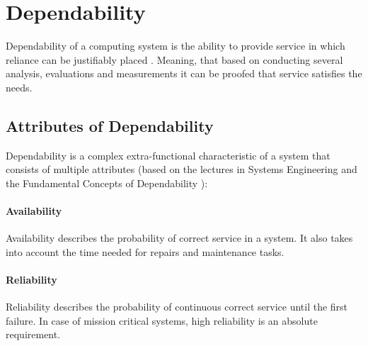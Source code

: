 

\section{Dependability}

Dependability of a computing system is the ability to provide service in which reliance can be justifiably placed \cite{DependabilityBMEMIT}. Meaning, that based on conducting several analysis, evaluations and measurements it can be proofed that service satisfies the needs.

\subsection{Attributes of Dependability} \label{dependability-attributes}

Dependability is a complex extra-functional characteristic of a system that consists of multiple attributes (based on the lectures in Systems Engineering \cite{DependabilityBMEMIT} and the Fundamental Concepts of Dependability \cite{FundamentalConceptsOfDependability}):

\paragraph{Availability} Availability describes the probability of correct service in a system. It also takes into account the time needed for repairs and maintenance tasks.

\paragraph{Reliability} Reliability describes the probability of continuous correct service until the first failure. In case of mission critical systems, high reliability is an absolute requirement.

